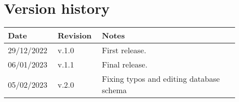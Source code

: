 \chapter*{Version history}

\begin{center}
	\begin{tabular}{@{}p{0.18\linewidth} p{0.18\linewidth} p{0.57\linewidth}@{}}
		\toprule
		\textbf{Date} & \textbf{Revision} & \textbf{Notes}\\
		\midrule
		29/12/2022 & v.1.0 & First release.\\
            06/01/2023 & v.1.1 & Final release.\\
            05/02/2023 & v.2.0 & Fixing typos and editing database schema\\
		\bottomrule
	\end{tabular}
\end{center}